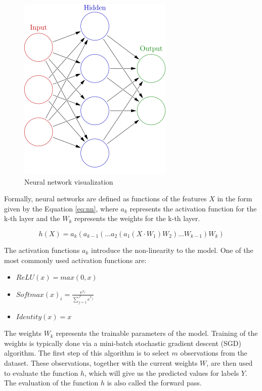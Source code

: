\begin{figure}[H]
    \centering
    \includegraphics[width=0.5\linewidth]{images/neural_network.png}
    \caption{Neural network visualization}
    \label{fig:neural_network}
\end{figure}

Formally, neural networks are defined as functions of the features $X$ in the form given by the Equation \ref{eq:nn}, where $a_k$ represents the activation function for the k-th layer and the $W_k$ represents the weights for the k-th layer.

\begin{equation}
    h(X) = a_k(a_{k-1}(...a_2(a_1(X \cdot W_1)W_2)...W_{k-1})W_{k})
    \label{eq:nn}
\end{equation}

The activation functions $a_k$ introduce the non-linearity to the model.
One of the most commonly used activation functions are:
\begin{itemize}
    \item $ReLU(x) = max(0, x)$ 
    \item $Softmax(x)_i = \frac{e^{x_i}}{\sum_{j=1}^{J} e^{x_j}}$ 
    \item $Identity(x) = x$ 
\end{itemize}

The weights $W_k$ represents the trainable parameters of the model.
Training of the weights is typically done via a mini-batch stochastic gradient descent (SGD) algorithm.
The first step of this algorithm is to select $m$ observations from the dataset.
These observations, together with the current weights $W$, are then used to evaluate the function $h$, which will give us the predicted values for labels $Y$.
The evaluation of the function $h$ is also called the forward pass.

